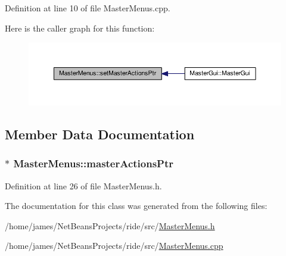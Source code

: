Definition at line 10 of file Master\-Menus.\-cpp.



Here is the caller graph for this function\-:
\nopagebreak
\begin{figure}[H]
\begin{center}
\leavevmode
\includegraphics[width=350pt]{class_master_menus_a8953d8e2f0cab66bade92acc88fc04a6_icgraph}
\end{center}
\end{figure}




\subsection{Member Data Documentation}
\hypertarget{class_master_menus_ab5ba9c46b8ad0e6eb11345e055ac469d}{
\subsubsection[{master\-Actions\-Ptr}]{$\ast$ Master\-Menus\-::master\-Actions\-Ptr\hspace{0.3cm}{\ttfamily [private]}}}\label{class_master_menus_ab5ba9c46b8ad0e6eb11345e055ac469d}


Definition at line 26 of file Master\-Menus.\-h.



The documentation for this class was generated from the following files\-:\begin{DoxyCompactItemize}
\item 
/home/james/\-Net\-Beans\-Projects/ride/src/\hyperlink{_master_menus_8h}{Master\-Menus.\-h}\item 
/home/james/\-Net\-Beans\-Projects/ride/src/\hyperlink{_master_menus_8cpp}{Master\-Menus.\-cpp}\end{DoxyCompactItemize}
